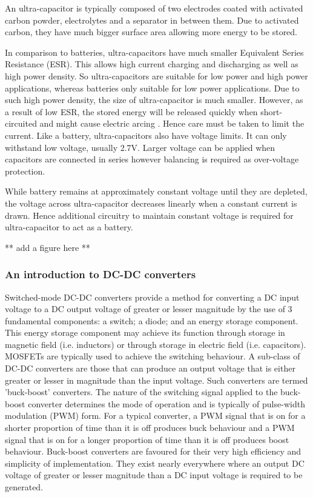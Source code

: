 An ultra-capacitor is typically composed of two electrodes coated with activated carbon powder, electrolytes and a separator in between them. Due to activated carbon, they have much bigger surface area allowing more energy to be stored. 

In comparison to batteries, ultra-capacitors have much smaller Equivalent Series Resistance (ESR). This allows high current charging and discharging as well as high power density. So ultra-capacitors are suitable for low power and high power applications, whereas batteries only suitable for low power applications. Due to such high power density, the size of ultra-capacitor is much smaller. However, as a result of low ESR, the stored energy will be released quickly when short-circuited and might cause electric arcing \cite{murata}. Hence care must be taken to limit the current. Like a battery, ultra-capacitors also have voltage limits. It can only withstand low voltage, usually 2.7V. Larger voltage can be applied when capacitors are connected in series however balancing is required as over-voltage protection. 

While battery remains at approximately constant voltage until they are depleted, the voltage across ultra-capacitor decreases linearly when a constant current is drawn. Hence additional circuitry to maintain constant voltage is required for ultra-capacitor to act as a battery. 

** add a figure here **

\subsubsection{An introduction to DC-DC converters}
Switched-mode DC-DC converters provide a method for converting a DC input voltage to a DC output voltage of greater or lesser magnitude by the use of 3 fundamental components: a switch; a diode; and an energy storage component. This energy storage component may achieve its function through storage in magnetic field (i.e. inductors) or through storage in electric field (i.e. capacitors). MOSFETs are typically used to achieve the switching behaviour.
\newpar
A sub-class of DC-DC converters are those that can produce an output voltage that is either greater or lesser in magnitude than the input voltage. Such converters are termed 'buck-boost' converters. The nature of the switching signal applied to the buck-boost converter determines the mode of operation and is typically of pulse-width modulation (PWM) form. For a typical converter, a PWM signal that is on for a shorter proportion of time than it is off produces buck behaviour and a PWM signal that is on for a longer proportion of time than it is off produces boost behaviour.
\newpar
Buck-boost converters are favoured for their very high efficiency and simplicity of implementation. They exist nearly everywhere where an output DC voltage of greater or lesser magnitude than a DC input voltage is required to be generated.

